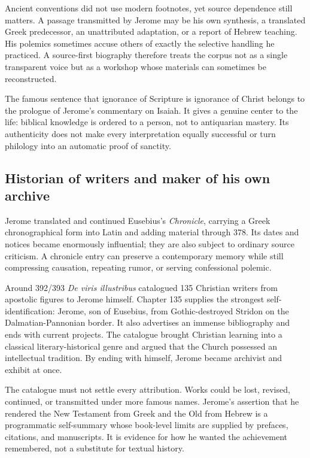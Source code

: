 Ancient conventions did not use modern footnotes, yet source dependence still
matters. A passage transmitted by Jerome may be his own synthesis, a translated
Greek predecessor, an unattributed adaptation, or a report of Hebrew teaching.
His polemics sometimes accuse others of exactly the selective handling he
practiced. A source-first biography therefore treats the corpus not as a single
transparent voice but as a workshop whose materials can sometimes be
reconstructed.

The famous sentence that ignorance of Scripture is ignorance of Christ belongs
to the prologue of Jerome's commentary on Isaiah. It gives a genuine center to
the life: biblical knowledge is ordered to a person, not to antiquarian mastery.
Its authenticity does not make every interpretation equally successful or turn
philology into an automatic proof of sanctity.

\subsection{Historian of writers and maker of his own archive}

Jerome translated and continued Eusebius's \emph{Chronicle}, carrying a Greek
chronographical form into Latin and adding material through 378. Its dates and
notices became enormously influential; they are also subject to ordinary source
criticism. A chronicle entry can preserve a contemporary memory while still
compressing causation, repeating rumor, or serving confessional polemic.

Around 392/393 \emph{De viris illustribus} catalogued 135 Christian writers
from apostolic figures to Jerome himself. Chapter 135 supplies the strongest
self-identification: Jerome, son of Eusebius, from Gothic-destroyed Stridon on
the Dalmatian-Pannonian border. It also advertises an immense bibliography and
ends with current projects. The catalogue brought Christian learning into a
classical literary-historical genre and argued that the Church possessed an
intellectual tradition. By ending with himself, Jerome became archivist and
exhibit at once.

The catalogue must not settle every attribution. Works could be lost, revised,
continued, or transmitted under more famous names. Jerome's assertion that he
rendered the New Testament from Greek and the Old from Hebrew is a programmatic
self-summary whose book-level limits are supplied by prefaces, citations, and
manuscripts. It is evidence for how he wanted the achievement remembered, not a
substitute for textual history.

